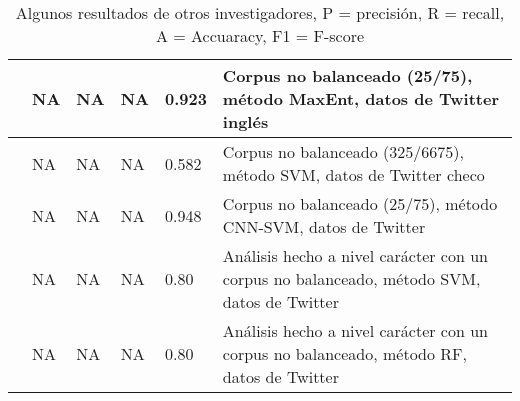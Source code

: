 \begin{table}[!ht]
\begin{tabular}{|l|l|l|l|l|p{4cm}|}
\cite{ptavcek2014sarcasm}      & NA        & NA     & NA        & 0.923   & Corpus no balanceado (25/75), método  MaxEnt, datos de Twitter inglés                                                                                                                                                                                       \\ \hline
\cite{ptavcek2014sarcasm}      & NA        & NA     & NA        & 0.582   & Corpus no balanceado (325/6675), método  SVM, datos de Twitter checo                                                                                                                                                                                       \\ \hline
\cite{poria2016deeper}      & NA        & NA     & NA        & 0.948   & Corpus no balanceado (25/75), método  CNN-SVM, datos de Twitter                                                                                                                                                                                              \\ \hline
\cite{lopez2016character}      & NA        & NA     & NA        & 0.80     & Análisis hecho a nivel carácter con un corpus no balanceado, método SVM, datos de Twitter                                                                                       \\ \hline       \cite{lopez2016character}      & NA        & NA     & NA        & 0.80     & Análisis hecho a nivel carácter con un corpus no balanceado, método RF, datos de Twitter                                                                                       \\ \hline                                                                        
\end{tabular}
\caption{Algunos resultados de otros investigadores, P  = precisión, R = recall, A = Accuaracy, F1 = F-score}
\label{tab:resultados}
\end{table}
		
